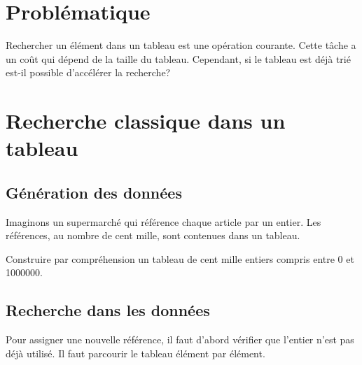 \documentclass[a4paper,11pt]{article}
\begin{document}
\section{Problématique}
Rechercher un élément dans un tableau est une opération courante. Cette tâche a un coût qui dépend de la taille du tableau.
Cependant, si le tableau est déjà trié est-il possible d'accélérer la recherche?
\begin{center}
\end{center}
\section{Recherche classique dans un tableau}
\subsection{Génération des données}
Imaginons un supermarché qui référence chaque article par un entier. Les références, au nombre de cent mille, sont contenues dans un tableau.
\begin{activite}
    Construire par compréhension un tableau de cent mille entiers compris entre 0 et 1000000.
\end{activite}
\subsection{Recherche dans les données}
Pour assigner une nouvelle référence, il faut d'abord vérifier que l'entier n'est pas déjà utilisé. Il faut parcourir le tableau élément par élément.
\begin{center}
\end{center}
\end{document}

